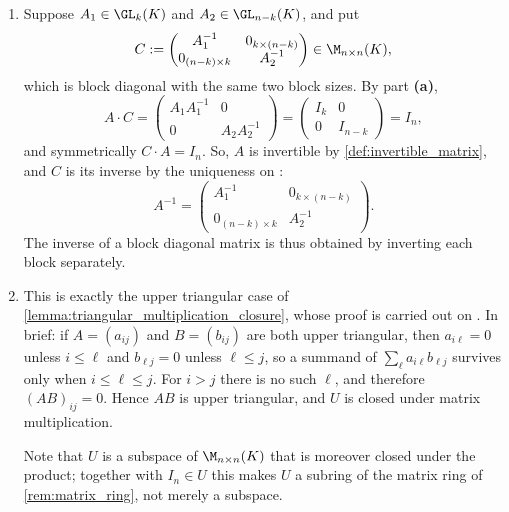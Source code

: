 \begin{exercisesolution}
\begin{enumerate}[label=\textbf{(\alph*)}]
    \item Suppose $A_1 \in \GL_k(K)$ and $A_2 \in \GL_{n-k}(K)$, and put
    \[
        C := \begin{pmatrix} A_1^{-1} & 0_{k \times (n-k)} \\ 0_{(n-k) \times k} & A_2^{-1} \end{pmatrix} \in \M_{n \times n}(K),
    \]
    which is block diagonal with the same two block sizes. By part \textbf{(a)},
    \[
        A \cdot C = \begin{pmatrix} A_1 A_1^{-1} & 0 \\ 0 & A_2 A_2^{-1} \end{pmatrix} = \begin{pmatrix} I_k & 0 \\ 0 & I_{n-k} \end{pmatrix} = I_n,
    \]
    and symmetrically $C \cdot A = I_n$. So, $A$ is invertible by \cref{def:invertible_matrix}, and $C$ is its inverse by the uniqueness on :
    \[
        A^{-1} = \begin{pmatrix} A_1^{-1} & 0_{k \times (n-k)} \\ 0_{(n-k) \times k} & A_2^{-1} \end{pmatrix}.
    \]
    The inverse of a block diagonal matrix is thus obtained by inverting each block separately.

    \item This is exactly the upper triangular case of \cref{lemma:triangular_multiplication_closure}, whose proof is carried out on . In brief: if $A = (a_{ij})$ and $B = (b_{ij})$ are both upper triangular, then $a_{i\ell} = 0$ unless $i \le \ell$ and $b_{\ell j} = 0$ unless $\ell \le j$, so a summand of $\sum_{\ell} a_{i\ell} b_{\ell j}$ survives only when $i \le \ell \le j$. For $i > j$ there is no such $\ell$, and therefore $(AB)_{ij} = 0$. Hence $AB$ is upper triangular, and $U$ is closed under matrix multiplication.

    Note that $U$ is a subspace of $\M_{n \times n}(K)$ that is moreover closed under the product; together with $I_n \in U$ this makes $U$ a subring of the matrix ring of \cref{rem:matrix_ring}, not merely a subspace.
\end{enumerate}
\end{exercisesolution}

